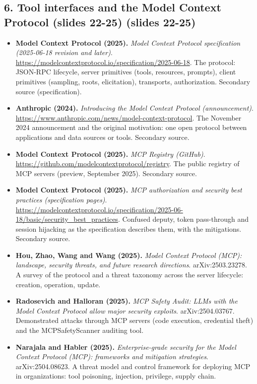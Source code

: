\documentclass[11pt,letterpaper]{article}
\begin{document}
\subsection*{6. Tool interfaces and the Model Context Protocol (slides 22-25) (slides 22-25)}
\begin{itemize}[leftmargin=1.2em,itemsep=3pt]\sloppy
\item \textbf{Model Context Protocol (2025).} \textit{Model Context Protocol specification (2025-06-18 revision and later)}. \url{https://modelcontextprotocol.io/specification/2025-06-18}. The protocol: JSON-RPC lifecycle, server primitives (tools, resources, prompts), client primitives (sampling, roots, elicitation), transports, authorization. Secondary source (specification).
\item \textbf{Anthropic (2024).} \textit{Introducing the Model Context Protocol (announcement)}. \url{https://www.anthropic.com/news/model-context-protocol}. The November 2024 announcement and the original motivation: one open protocol between applications and data sources or tools. Secondary source.
\item \textbf{Model Context Protocol (2025).} \textit{MCP Registry (GitHub)}. \url{https://github.com/modelcontextprotocol/registry}. The public registry of MCP servers (preview, September 2025). Secondary source.
\item \textbf{Model Context Protocol (2025).} \textit{MCP authorization and security best practices (specification pages)}. \url{https://modelcontextprotocol.io/specification/2025-06-18/basic/security_best_practices}. Confused deputy, token pass-through and session hijacking as the specification describes them, with the mitigations. Secondary source.
\item \textbf{Hou, Zhao, Wang and Wang (2025).} \textit{Model Context Protocol (MCP): landscape, security threats, and future research directions}. arXiv:2503.23278. A survey of the protocol and a threat taxonomy across the server lifecycle: creation, operation, update.
\item \textbf{Radosevich and Halloran (2025).} \textit{MCP Safety Audit: LLMs with the Model Context Protocol allow major security exploits}. arXiv:2504.03767. Demonstrated attacks through MCP servers (code execution, credential theft) and the MCPSafetyScanner auditing tool.
\item \textbf{Narajala and Habler (2025).} \textit{Enterprise-grade security for the Model Context Protocol (MCP): frameworks and mitigation strategies}. arXiv:2504.08623. A threat model and control framework for deploying MCP in organizations: tool poisoning, injection, privilege, supply chain.

\end{itemize}
\end{document}
